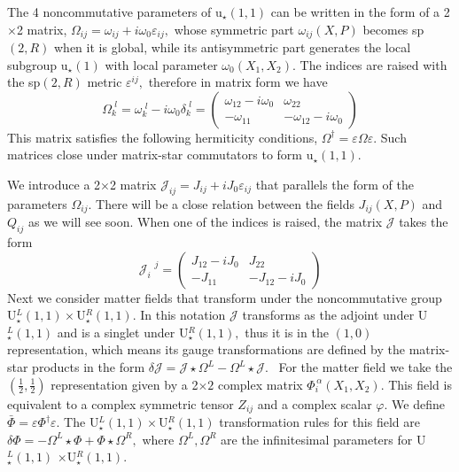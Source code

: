 \documentclass[a4paper,12pt]{article}
\begin{document}
The 4 noncommutative parameters of u$_{\star }\left( 1,1\right) $ can be
written in the form of a 2$\times $2 matrix, $\Omega _{ij}=\omega
_{ij}+i\omega _{0}\varepsilon _{ij},$ whose symmetric part $\omega
_{ij}\left( X,P\right) $ becomes sp$\left( 2,R\right) $ when it is global,
while its antisymmetric part generates the local subgroup u$_{\star }\left(
1\right) $ with local parameter $\omega _{0}\left( X_{1},X_{2}\right) .$ The
indices are raised with the sp$\left( 2,R\right) $ metric $\varepsilon
^{ij}, $ therefore in matrix form we have
\begin{equation}
\Omega _{k}^{\,\,l}=\omega _{k}^{\,\,l}-i\omega _{0}\delta
_{k}^{\,\,l}=\left(
\begin{array}{cc}
\omega _{12}-i\omega _{0} & \omega _{22} \\
-\omega _{11} & -\omega _{12}-i\omega _{0}
\end{array}
\right)  \label{omega}
\end{equation}
This matrix satisfies the following hermiticity conditions, $\Omega
^{\dagger }=\varepsilon \Omega \varepsilon .$ Such matrices close under
matrix-star commutators to form u$_{\star }\left( 1,1\right) .$

We introduce a 2$\times $2 matrix $\mathcal{J}_{ij}=J_{ij}+iJ_{0}\varepsilon
_{ij}$ that parallels the form of the parameters $\Omega _{ij}.$ There will
be a close relation between the fields $J_{ij}\left( X,P\right) $ and $%
Q_{ij} $ as we will see soon. When one of the indices is raised,
the matrix $ \mathcal{J}$ takes the form
\begin{equation}
\mathcal{J}_{i}^{\,\,\,\,\,j}=\left(
\begin{array}{cc}
J_{12}-iJ_{0} & J_{22} \\
-J_{11} & -J_{12}-iJ_{0}
\end{array}
\right)  \label{J}
\end{equation}
Next we consider matter fields that transform under the
noncommutative group U$_{\star }^{L}\left( 1,1\right) \times
$U$_{\star }^{R}\left( 1,1\right) .$ In this notation
$\mathcal{J}$ transforms as the adjoint under U$_{\star
}^{L}\left( 1,1\right) $ and is a singlet under U$_{\star
}^{R}\left( 1,1\right) ,$ thus it is in the $\left( 1,0\right) $
representation, which means its gauge transformations are defined
by the matrix-star products in the form $\delta
\mathcal{J}=\mathcal{J}\star \Omega ^{L}-\Omega ^{L}\star
\mathcal{J}$. \ For the matter field we take the $\left(
\frac{1}{2},\frac{1 }{2}\right) $ representation given by a
2$\times 2$ complex matrix $\Phi _{i}^{\,\alpha }\left(
X_{1},X_{2}\right) .$ This field is equivalent to a complex
symmetric tensor $Z_{ij}$ and a complex scalar $\varphi .$ We
define $\bar{\Phi}=\varepsilon \Phi ^{\dagger }\varepsilon .$ The
U$_{\star }^{L}\left( 1,1\right) \times $U$_{\star }^{R}\left(
1,1\right) $ transformation rules for this field are $\delta \Phi
=-\Omega ^{L}\star \Phi +\Phi \star \Omega ^{R},$ where $\Omega
^{L},\Omega ^{R}$ are the infinitesimal parameters for U$_{\star
}^{L}\left( 1,1\right) $ $\times $U$ _{\star }^{R}\left(
1,1\right) .$
\end{document}
